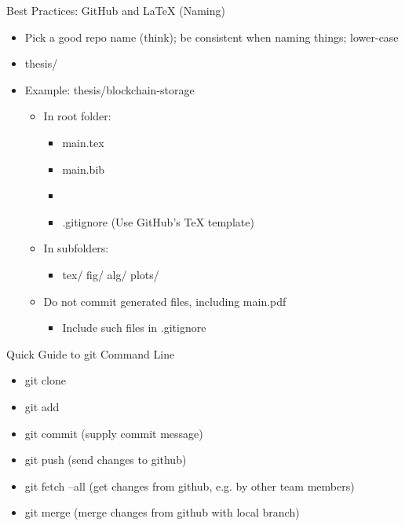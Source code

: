 \documentclass[hyperref={pdfpagelabels=false}, aspectratio=1610]{beamer}
\begin{document}
\begin{frame}
\begin{block}{Best Practices: GitHub and LaTeX (Naming)}
 \begin{itemize}
\item Pick a good repo name (think); be consistent when naming things; lower-case
\item thesis/
\item Example: thesis/blockchain-storage
  \begin{itemize}
  	\item In  root folder:
	\begin{itemize}
		\item main.tex
		\item main.bib
		\item {}
		\item .gitignore \quad (Use GitHub's TeX template)
	\end{itemize}
	\item In subfolders:
	\begin{itemize}
		\item tex/ \quad fig/ \quad alg/ \quad plots/
	\end{itemize}
	\item Do not commit generated files, including main.pdf
	\begin{itemize}
		\item Include such files in .gitignore
	\end{itemize}
  \end{itemize}
  \end{itemize}
\end{block}
\end{frame}

\begin{frame}
\begin{block}{Quick Guide to git Command Line}
 \begin{itemize}
  \item git clone 
  \item git add 
  \item git commit \quad (supply commit message)
  \item git push \quad (send changes to github)
  \item git fetch --all \quad (get changes from github, e.g. by other team members)
  \item git merge \quad (merge changes from github with local branch)
 \end{itemize}
\end{block}
\end{frame}
\end{document}
